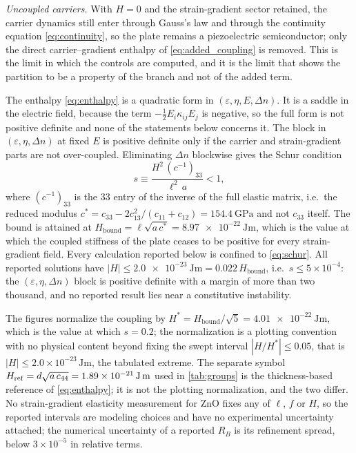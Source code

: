 \emph{Uncoupled carriers.}  With $H=0$ and the strain-gradient sector retained,
the carrier dynamics still enter through Gauss's law and through the continuity
equation \eqref{eq:continuity}, so the plate remains a piezoelectric
semiconductor; only the direct carrier--gradient enthalpy of
\eqref{eq:added_coupling} is removed.  This is the limit in which the controls are computed, and it is the limit that shows the
partition to be a property of the branch and not of the added term.

The enthalpy \eqref{eq:enthalpy} is a quadratic form in
$(\varepsilon,\eta,E,\Delta n)$.  It is a saddle in the electric field, because the
term $-\tfrac12E_i\kappa_{ij}E_j$ is negative, so the full form is not positive definite and
none of the statements below concerns it.  The block in $(\varepsilon,\eta,\Delta n)$ at
fixed $E$ is positive definite only if the carrier and strain-gradient parts are not over-coupled.  Eliminating $\Delta n$ blockwise
gives the Schur condition
\begin{equation}
\label{eq:schur}
s\equiv\frac{H^2\,(c^{-1})_{33}}{\ell^2\,a}<1 ,
\end{equation}
where $(c^{-1})_{33}$ is the $33$ entry of the inverse of the full elastic
matrix, i.e.\ the reduced modulus
$c^{*}=c_{33}-2c_{13}^2/(c_{11}+c_{12})=\SI{154.4}{\giga\pascal}$ and not $c_{33}$
itself.  The bound is attained at
$H_{\text{bound}}=\ell\sqrt{a\,c^{*}}=\SI{8.97e-22}{\joule\metre}$, which is the
value at which the coupled stiffness of the plate ceases to be positive for
every strain-gradient field.  Every calculation reported below is confined to \eqref{eq:schur}.  All reported solutions have
$|H|\le\SI{2.0e-23}{\joule\metre}=0.022\,H_{\text{bound}}$, i.e.\ $s\le
5\times10^{-4}$: the $(\varepsilon,\eta,\Delta n)$ block is positive definite with a margin of more than two
thousand, and no reported result lies near a constitutive instability.

The figures normalize the coupling by
$H^{*}=H_{\text{bound}}/\sqrt5=\SI{4.01e-22}{\joule\metre}$, which is the value
at which $s=0.2$; the normalization is a plotting convention with no physical
content beyond fixing the swept interval $|H/H^{*}|\le0.05$, that is
$|H|\le2.0\times10^{-23}\,\si{\joule\metre}$, the tabulated extreme.  The
separate symbol $H_{\mathrm{ref}}=d\sqrt{a\,c_{44}}=\SI{1.89e-21}{%
\joule\metre}$ used in \cref{tab:groups} is the thickness-based
reference of \eqref{eq:enthalpy}; it is not the plotting normalization, and the two differ.  No strain-gradient elasticity measurement for
ZnO fixes any of $\ell$, $f$ or $H$, so the reported intervals are modeling
choices and have no experimental uncertainty attached; the numerical uncertainty of a
reported $R_B$ is its refinement spread, below $3\times10^{-5}$ in relative terms.
